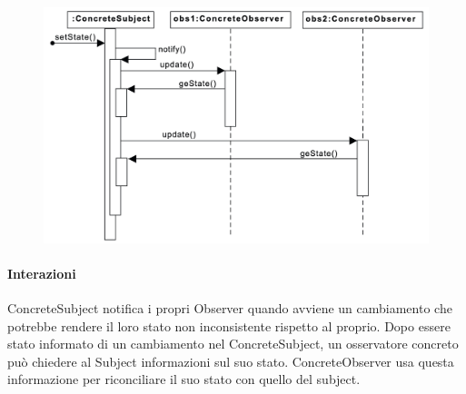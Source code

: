 \begin{figure}[H]
    \centering
    \includegraphics[width=1\linewidth]{assets/pattern/observer/observer-sequence.png}
\end{figure}

\paragraph{Interazioni} ConcreteSubject notifica i propri Observer quando avviene un cambiamento che potrebbe rendere il loro stato non inconsistente rispetto al proprio. Dopo essere stato informato di un cambiamento nel ConcreteSubject, un osservatore concreto può chiedere al Subject informazioni sul suo stato. ConcreteObserver usa questa informazione per riconciliare il suo stato con quello del subject.

\newpage